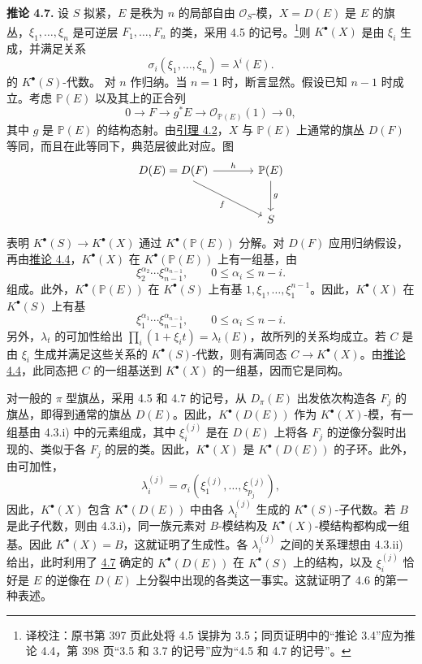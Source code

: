 \textbf{推论 4.7.} 设 \(S\) 拟紧，\(E\) 是秩为 \(n\) 的局部自由 \(\mathcal O_S\)-模，\(X=D(E)\) 是 \(E\) 的旗丛，\(\xi_1,\ldots,\xi_n\) 是可逆层 \(F_1,\ldots,F_n\) 的类，采用 4.5 的记号。\footnote{译校注：原书第 397 页此处将 4.5 误排为 3.5；同页证明中的“推论 3.4”应为推论 4.4，第 398 页“3.5 和 3.7 的记号”应为“4.5 和 4.7 的记号”。}则 \(K^\bullet(X)\) 是由 \(\xi_i\) 生成，并满足关系
\[
  \sigma_i(\xi_1,\ldots,\xi_n)=\lambda^i(E).
\]
的 \(K^\bullet(S)\)-代数。
对 \(n\) 作归纳。当 \(n=1\) 时，断言显然。假设已知 \(n-1\) 时成立。考虑 \(\mathbb P(E)\) 以及其上的正合列
\[
  0\longrightarrow F\longrightarrow g^*E\longrightarrow \mathcal O_{\mathbb P(E)}(1)\longrightarrow 0,
\]
其中 \(g\) 是 \(\mathbb P(E)\) 的结构态射。由\hyperlink{sga6.e06.lem.4-2}{引理 4.2}，\(X\) 与 \(\mathbb P(E)\) 上通常的旗丛 \(D(F)\) 等同，而且在此等同下，典范层彼此对应。图
\[
\begin{tikzcd}[column sep=large,row sep=large]
D(E)=D(F) \arrow[r,"h"] \arrow[dr,"f"'] & \mathbb P(E) \arrow[d,"g"]\\
& S
\end{tikzcd}
\]
表明 \(K^\bullet(S)\to K^\bullet(X)\) 通过 \(K^\bullet(\mathbb P(E))\) 分解。对 \(D(F)\) 应用归纳假设，再由\hyperlink{sga6.e06.cor.4-4}{推论 4.4}，\(K^\bullet(X)\) 在 \(K^\bullet(\mathbb P(E))\) 上有一组基，由
\[
  \xi_2^{\alpha_2}\cdots \xi_{n-1}^{\alpha_{n-1}},
  \qquad 0\leq \alpha_i\leq n-i.
\]
组成。此外，\(K^\bullet(\mathbb P(E))\) 在 \(K^\bullet(S)\) 上有基 \(1,\xi_1,\ldots,\xi_1^{n-1}\)。因此，\(K^\bullet(X)\) 在 \(K^\bullet(S)\) 上有基
\[
  \xi_1^{\alpha_1}\cdots \xi_{n-1}^{\alpha_{n-1}},
  \qquad 0\leq \alpha_i\leq n-i.
\]
另外，\(\lambda_t\) 的可加性给出 \(\prod_i(1+\xi_i t)=\lambda_t(E)\)，故所列的关系均成立。若 \(C\) 是由 \(\xi_i\) 生成并满足这些关系的 \(K^\bullet(S)\)-代数，则有满同态 \(C\to K^\bullet(X)\)。由\hyperlink{sga6.e06.cor.4-4}{推论 4.4}，此同态把 \(C\) 的一组基送到 \(K^\bullet(X)\) 的一组基，因而它是同构。

对一般的 \(\pi\) 型旗丛，采用 4.5 和 4.7 的记号，从 \(D_\pi(E)\) 出发依次构造各 \(F_j\) 的旗丛，即得到通常的旗丛 \(D(E)\)。因此，\(K^\bullet(D(E))\) 作为 \(K^\bullet(X)\)-模，有一组基由 4.3.i) 中的元素组成，其中 \(\xi_i^{(j)}\) 是在 \(D(E)\) 上将各 \(F_j\) 的逆像分裂时出现的、类似于各 \(F_j\) 的层的类。因此，\(K^\bullet(X)\) 是 \(K^\bullet(D(E))\) 的子环。此外，由可加性，
\[
  \lambda_i^{(j)}=\sigma_i(\xi_1^{(j)},\ldots,\xi_{p_j}^{(j)}),
\]
因此，\(K^\bullet(X)\) 包含 \(K^\bullet(D(E))\) 中由各 \(\lambda_i^{(j)}\) 生成的 \(K^\bullet(S)\)-子代数。若 \(B\) 是此子代数，则由 4.3.i)，同一族元素对 \(B\)-模结构及 \(K^\bullet(X)\)-模结构都构成一组基。因此 \(K^\bullet(X)=B\)，这就证明了生成性。各 \(\lambda_i^{(j)}\) 之间的关系理想由 4.3.ii) 给出，此时利用了 \hyperlink{sga6.e06.cor.4-7}{4.7} 确定的 \(K^\bullet(D(E))\) 在 \(K^\bullet(S)\) 上的结构，以及 \(\xi_i^{(j)}\) 恰好是 \(E\) 的逆像在 \(D(E)\) 上分裂中出现的各类这一事实。这就证明了 4.6 的第一种表述。

